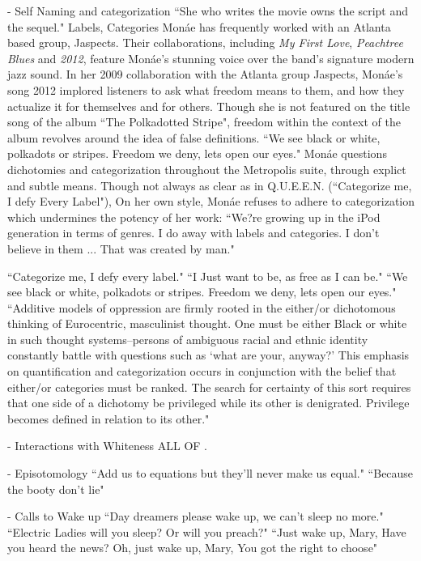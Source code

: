 \documentclass[a4paper, 11pt]{article} %
\begin{document}
- Self Naming and categorization
``She who writes the movie owns the script and the sequel."\cite{queen}
Labels, Categories
Mon\'ae has frequently worked with an Atlanta based group, Jaspects.
Their collaborations, including \emph{My First Love}, \emph{Peachtree Blues} and \emph{2012}, feature Mon\'ae's stunning voice over the band's signature modern jazz sound\cite{peachtreeblues}\cite{myfirstlove}.
In her 2009 collaboration with the Atlanta group Jaspects, Mon\'ae's song 2012 implored listeners to ask what freedom means to them, and how they actualize it for themselves and for others.
Though she is not featured on the title song of the album ``The Polkadotted Stripe", freedom within the context of the album revolves around the idea of false definitions.
``We see black or white, polkadots or stripes. Freedom we deny, lets open our eyes."\cite{polkadottedstripe}
Mon\'ae questions dichotomies and categorization throughout the Metropolis suite, through explict and subtle means.
Though not always as clear as in Q.U.E.E.N. (``Categorize me, I defy Every Label"\cite{queen}), 
On her own style, Mon\'ae refuses to adhere to categorization which undermines the potency of her work:
``We?re growing up in the iPod generation in terms of genres. I do away with labels and categories. I don't believe in them ... That was created by man."\cite{joeyguerra2010}


``Categorize me, I defy every label."\cite{queen}
``I Just want to be, as free as I can be."\cite{polkadottedstripe}
``We see black or white, polkadots or stripes. Freedom we deny, lets open our eyes."\cite{polkadottedstripe}
``Additive models of oppression are firmly rooted in the either/or dichotomous thinking of Eurocentric, masculinist thought. One must be either Black or white in such thought systems--persons of ambiguous racial and ethnic identity constantly battle with questions such as `what are your, anyway?' This emphasis on quantification and categorization occurs in conjunction with the belief that either/or categories must be ranked. The search for certainty of this sort requires that one side of a dichotomy be privileged while its other is denigrated. Privilege becomes defined in relation to its other."\cite{collins2009}


- Interactions with Whiteness
ALL OF \cite{favoritefugitive}.

- Episotomology
``Add us to equations but they'll never make us equal."\cite{queen}
``Because the booty don't lie"\cite{queen}

- Calls to Wake up
``Day dreamers please wake up, we can't sleep no more."\cite{sincerelyjane}
``Electric Ladies will you sleep? Or will you preach?"\cite{queen}
``Just wake up, Mary, Have you heard the news? Oh, just wake up, Mary, You got the right to choose"\cite{sallyride}
\end{document}
